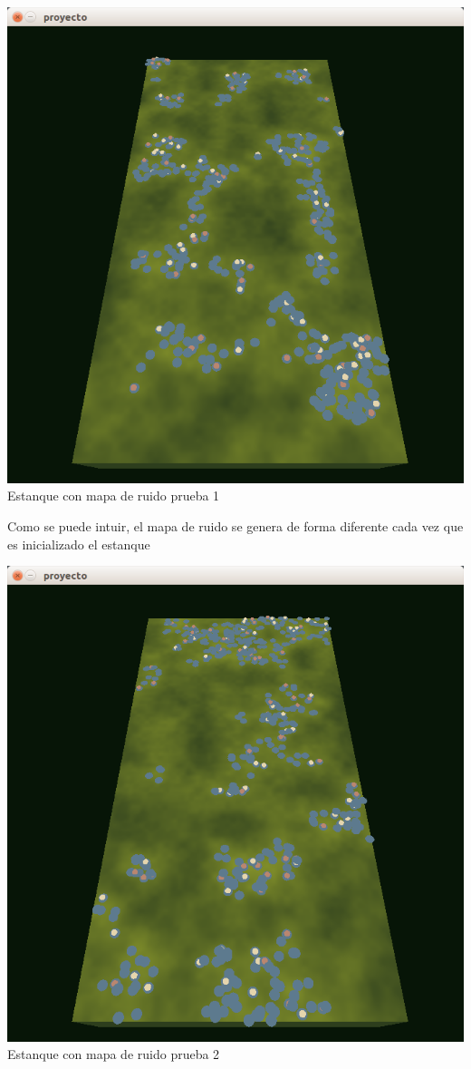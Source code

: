 \documentclass[11pt,a4paper]{article}
\begin{document}
			\begin{center}
			\includegraphics[scale=.5]{CAP1}
			{\tiny Estanque con mapa de ruido prueba 1}
			\end{center}
			Como se puede intuir, el mapa de ruido se genera de forma diferente cada vez que es inicializado el estanque
			\begin{center}
			\includegraphics[scale=.5]{CAP2}
			{\tiny Estanque con mapa de ruido prueba 2}
			\end{center}
\end{document}

